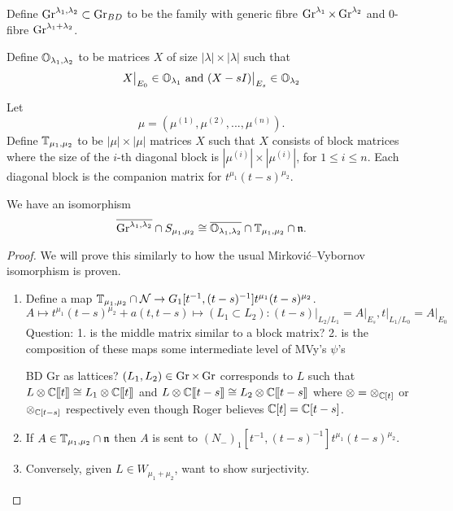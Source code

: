 \documentclass{article}
\begin{document}
Define $\operatorname{Gr}^{\lambda_1, \lambda_2} \subset \operatorname{Gr}_{BD}$ to be the family with generic fibre $\operatorname{Gr}^{\lambda_1} \times \operatorname{Gr}^{\lambda_2}$ and 0-fibre $\operatorname{Gr}^{\lambda_1 + \lambda_2}$.

Define $\mathbb O_{\lambda_1, \lambda_2}$ to be matrices $X$ of size $|\lambda| \times |\lambda|$ such that 
\[
        X\big|_{E_0} \in \mathbb O_{\lambda_1} 
        \text{ and }
        (X-sI)\big|_{E_s} \in \mathbb O_{\lambda_2}
\]

Let 
\[
\mu = (\mu^{(1)}, \mu^{(2)}, ..., \mu^{(n)}).
\]
Define $\mathbb T_{\mu_1, \mu_2}$ to be $|\mu| \times |\mu|$ matrices $X$ such that $X$ consists of block matrices where the size of the $i$-th diagonal block is $|\mu^{(i)}| \times |\mu^{(i)}|$, for $1\leq i \leq n$. Each diagonal block is the companion matrix for $t^{\mu_1}(t-s)^{\mu_2}$.

\begin{theorem}
We have an isomorphism
\[
    \overline{\operatorname{Gr}^{\lambda_1, \lambda_2}} \cap S_{\mu_1, \mu_2} \cong
    \overline{\mathbb O_{\lambda_1, \lambda_2}} \cap \mathbb T_{\mu_1, \mu_2} \cap \mathfrak n.
\]
\end{theorem}


\begin{proof}
We will prove this similarly to how the usual Mirkovi\'c--Vybornov isomorphism is proven.
\begin{enumerate}[label = Step \arabic*:]
    \item Define a map $\mathbb T_{\mu_1, \mu_2} \cap \mathcal N \rightarrow G_1[t^{-1}, (t-s)^{-1}] t^{\mu_1} (t-s)^{\mu_2}$.
    $$
    A \mapsto t^{\mu_1} (t-s)^{\mu_2} + a(t, t-s) \mapsto (L_1 \subset L_2) : (t-s)\big|_{L_2/L_1} = A\big|_{E_s}  , t\big|_{L_1/L_0} = A\big|_{E_0}
    $$
    Question: 1. is the middle matrix similar to a block matrix? 2. is the composition of these maps some intermediate level of MVy's $\psi$'s 

    BD Gr as lattices? $(L_1,L_2)\in\operatorname{Gr}\times\operatorname{Gr}$ corresponds to $L$ such that $L\otimes\mathbb C[\hspace{-.12em}[ {t} ]\hspace{-.12em}]\cong L_1\otimes\mathbb C[\hspace{-.12em}[ {t} ]\hspace{-.12em}]$ and $L\otimes\mathbb C[\hspace{-.12em}[ {t-s} ]\hspace{-.12em}]\cong L_2\otimes\mathbb C[\hspace{-.12em}[ {t-s} ]\hspace{-.12em}]$ where $\otimes = \otimes_{\mathbb C[t]}$ or $\otimes_{\mathbb C[t-s]}$ respectively even though Roger believes $\mathbb C[t] = \mathbb C[t-s]$.  

    \item If $A \in \mathbb T_{\mu_1,\mu_2} \cap \mathfrak n$ then $A$ is sent to $(N_-)_1[t^{-1}, (t-s)^{-1}] t^{\mu_1} (t-s)^{\mu_2}$. 

    \item Conversely, given $L \in W_{\mu_1 + \mu_2}$, want to show surjectivity.
\end{enumerate}
\end{proof}
\end{document}
